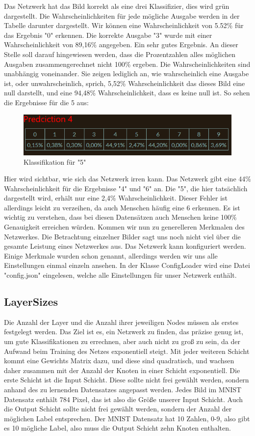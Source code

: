 \documentclass[12pt]{article}
\begin{document}
Das Netzwerk hat das Bild korrekt als eine drei Klassifizier, dies wird grün dargestellt. Die Wahrscheinlichkeiten für jede mögliche Ausgabe werden in der Tabelle darunter dargestellt. Wir können eine Wahrscheinlichkeit von 5.52\% für das Ergebnis "0" erkennen. Die korrekte Ausgabe "3" wurde mit einer Wahrscheinlichkeit von 89,16\% angegeben. Ein sehr gutes Ergebnis. An dieser Stelle soll darauf hingewiesen werden, dass die Prozentzahlen alles möglichen Ausgaben zusammengerechnet nicht 100\% ergeben. Die Wahrscheinlichkeiten sind unabhängig voneinander. Sie zeigen lediglich an, wie wahrscheinlich eine Ausgabe ist, oder unwahrscheinlich, sprich, 5,52\% Wahrscheinlichkeit das dieses Bild eine null darstellt, und eine 94,48\% Wahrscheinlichkeit, dass es keine null ist.
So sehen die Ergebnisse für die 5 aus:\begin{figure}[H]
\centering
\includegraphics[scale=0.60]{./Images/Pasted image 20231001134329.png}
\caption{Klassifikation für "5"}
\label{Klassifikation für "5"}
\end{figure}
Hier wird sichtbar, wie sich das Netzwerk irren kann. Das Netzwerk gibt eine 44\% Wahrscheinlichkeit für die Ergebnisse "4" und "6" an. Die "5", die hier tatsächlich dargestellt wird, erhält nur eine 2,4\% Wahrscheinlichkeit. Dieser Fehler ist allerdings leicht zu verzeihen, da auch Menschen häufig eine 6 erkennen. Es ist wichtig zu verstehen, dass bei diesen Datensätzen auch Menschen keine 100\% Genauigkeit erreichen würden. Kommen wir nun zu generelleren Merkmalen des Netzwerkes. Die Betrachtung einzelner Bilder sagt uns noch nicht viel über die gesamte Leistung eines Netzwerkes aus. Das Netzwerk kann konfiguriert werden. Einige Merkmale wurden schon genannt, allerdings werden wir uns alle Einstellungen einmal einzeln ansehen. In der Klasse ConfigLoader wird eine Datei "config.json" eingelesen, welche alle Einstellungen für unser Netzwerk enthält.
\subsection{LayerSizes}
Die Anzahl der Layer und die Anzahl ihrer jeweiligen Nodes müssen als erstes festgelegt werden. Das Ziel ist es, ein Netzwerk zu finden, das präzise genug ist, um gute Klassifikationen zu errechnen, aber auch nicht zu groß zu sein, da der Aufwand beim Training des Netzes exponentiell steigt. Mit jeder weiteren Schicht kommt eine Gewichts Matrix dazu, und diese sind quadratisch, und wachsen daher zusammen mit der Anzahl der Knoten in einer Schicht exponentiell. 
Die erste Schicht ist die Input Schicht. Diese sollte nicht frei gewählt werden, sondern anhand des zu lernenden Datensatzes angepasst werden. Jedes Bild im MNIST Datensatz enthält 784 Pixel, das ist also die Größe unserer Input Schicht.
Auch die Output Schicht sollte nicht frei gewählt werden, sondern der Anzahl der möglichen Label entsprechen. Der MNIST Datensatz hat 10 Zahlen, 0-9, also gibt es 10 mögliche Label, also muss die Output Schicht zehn Knoten enthalten.
\end{document}
